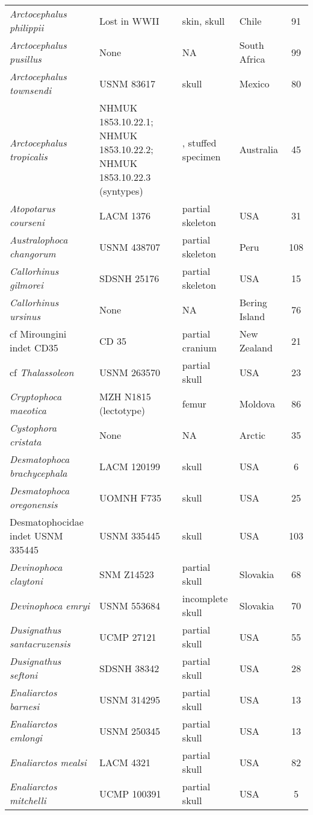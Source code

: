 \begin{longtable}{p{}p{}p{}lc}
\textit{Arctocephalus philippii} & 	Lost in WWII & 	skin, skull & 	Chile & 91\\
\textit{Arctocephalus pusillus} & 	None & 	NA & South Africa & 	99\\
\textit{Arctocephalus townsendi} & 	USNM 83617 & skull & 	Mexico & 80\\
\textit{Arctocephalus tropicalis} & NHMUK 1853.10.22.1; NHMUK 1853.10.22.2; NHMUK 1853.10.22.3 (syntypes) & , stuffed specimen & 	Australia & 45\\
\textit{Atopotarus courseni} & 	LACM 1376 & partial skeleton & 	USA & 31\\
\textit{Australophoca changorum} & 	USNM 438707 & partial skeleton & 	Peru & 	108\\
\textit{Callorhinus gilmorei} & 	SDSNH 25176 & partial skeleton & 	USA & 15\\
\textit{Callorhinus ursinus} & 	None & 	NA & 	Bering Island & 76\\
cf Miroungini indet CD35	& CD 35 & 	partial cranium & 	New Zealand & 21\\
cf \textit{Thalassoleon} & USNM 263570 & partial skull & USA & 23\\
\textit{Cryptophoca maeotica} & MZH N1815 (lectotype)	& femur	& Moldova & 86\\
\textit{Cystophora cristata} & 	None & 	NA & 	Arctic & 35\\
\textit{Desmatophoca brachycephala} &	LACM 120199 & 	skull & 	USA & 6\\
\textit{Desmatophoca oregonensis} &	UOMNH F735 & 	skull & 	USA & 25\\
Desmatophocidae indet USNM 335445 &	USNM 335445 & 	skull & 	USA & 103\\
\textit{Devinophoca claytoni} &	SNM Z14523 & 	partial skull & 	Slovakia & 68\\
\textit{Devinophoca emryi} &	USNM 553684 & 	incomplete skull & 	Slovakia & 	70\\
\textit{Dusignathus santacruzensis} &	UCMP 27121 & 	partial skull & 	USA & 55\\
\textit{Dusignathus seftoni} &	SDSNH 38342 & 	partial skull & 	USA & 28\\
\textit{Enaliarctos barnesi} &	USNM 314295 & 	partial skull & 	USA & 13\\
\textit{Enaliarctos emlongi} &	USNM 250345 & 	partial skull & 	USA & 13\\
\textit{Enaliarctos mealsi} &	LACM 4321 & 	partial skull & 	USA & 82\\
\textit{Enaliarctos mitchelli} &	UCMP 100391 & 	partial skull & 	USA & 5\\

\end{longtable}
